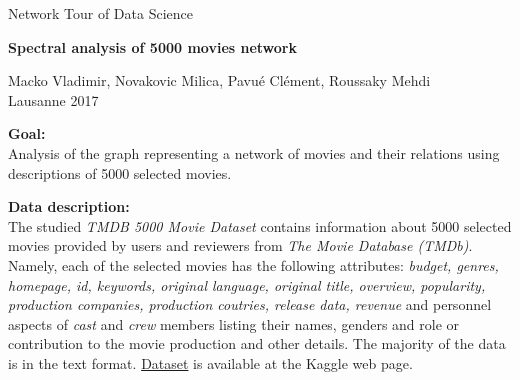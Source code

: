\documentclass[12pt,a4paper]{report}
\begin{document}


\pagestyle{empty}
\begin{center}


Network Tour of Data Science

\medskip





\vspace{5mm}

{\LARGE\bfseries Spectral analysis of 5000 movies network}


\vspace{5mm}

{\large Macko Vladimir, Novakovic Milica, Pavu{\'e} Cl{\'e}ment, Roussaky Mehdi}
\\Lausanne 2017
\vspace{5mm}

\end{center}
 \textbf{Goal:}\\ Analysis of the graph representing a network of movies and their relations using descriptions of 5000 selected movies. 

\vspace{5mm}

\noindent \textbf{Data description:}\\ The studied \textit{TMDB 5000 Movie Dataset} contains information about 5000 selected movies provided by users and reviewers from \textit{The Movie Database (TMDb)}.  Namely, each of the selected movies has the following attributes: \textit{budget, genres, homepage, id, keywords, original language, original title, overview, popularity, production companies, production coutries, release data, revenue} and personnel aspects of \textit{cast} and \textit{crew} members listing their names, genders and role or contribution to the movie production and other details. The majority of the data is in the text format. \href{https://www.kaggle.com/tmdb/tmdb-movie-metadata/data}{Dataset} is available at the Kaggle web page.
\vspace{5mm}
\end{document}
